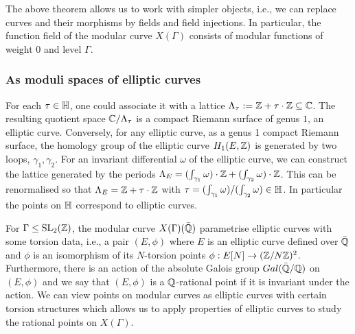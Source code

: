 The above theorem allows us to work with simpler objects, i.e., we can replace curves and their morphisms by fields and field injections. In particular, the function field of the modular curve $X(\Gamma)$ consists of modular functions of weight $0$ and level $\Gamma$. 

\subsubsection{As moduli spaces of elliptic curves}

For each $\tau \in \mathbb{H}$, one could associate it with a lattice $\Lambda_\tau := \mathbb{Z} + \tau \cdot \mathbb{Z} \subseteq \mathbb{C}$. The resulting quotient space $\mathbb{C}/\Lambda_\tau$ is a compact Riemann surface of genus $1$, an elliptic curve. Conversely, for any elliptic curve, as a genus 1 compact Riemann surface, the homology group of the elliptic curve $H_1(E,\mathbb{Z})$ is generated by two loops, $\gamma_1, \gamma_2$. For an invariant differential $\omega$ of the elliptic curve, we can construct the lattice generated by the periods $\Lambda_E = (\int_{\gamma_1} \omega) \cdot \mathbb{Z} + (\int_{\gamma_2} \omega) \cdot \mathbb{Z}$. This can be renormalised so that $\Lambda_E = \mathbb{Z} + \tau \cdot \mathbb{Z}$ with $\tau = (\int_{\gamma_1} \omega) /(\int_{\gamma_2} \omega) \in \mathbb{H}$. In particular the points on $\mathbb{H}$ correspond to elliptic curves.

For $\Gamma \leq \operatorname{SL}_2(\mathbb{Z})$, the modular curve $X(\Gamma)(\bar{\mathbb{Q}})$ parametrise elliptic curves with some torsion data, i.e., a pair $(E, \phi)$ where $E$ is an elliptic curve defined over $\bar{\mathbb{Q}}$ and $\phi$ is an isomorphism of its $N$-torsion points $\phi: E[N] \rightarrow (\mathbb{Z}/N\mathbb{Z})^2$. Furthermore, there is an action of the absolute Galois group $Gal(\bar{\mathbb{Q}}/\mathbb{Q})$ on $(E,\phi)$ and we say that $(E,\phi)$ is a $\mathbb{Q}$-rational point if it is invariant under the action. We can view points on modular curves as elliptic curves with certain torsion structures which allows us to apply properties of elliptic curves to study the rational points on $X(\Gamma)$.

